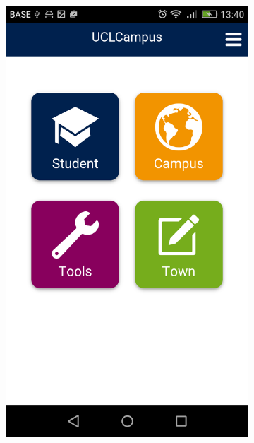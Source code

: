 \documentclass{eplmastersthesis}
\begin{document}
\begin{figure}[H]
    ~ %
    \begin{subfigure}[b]{0.3\textwidth}
        \includegraphics[width=\textwidth]{Images/Application_screens/Screenshot_2016-06-06-13-40-50.png}
    \end{subfigure}
    ~ %

\end{figure}
\end{document}
